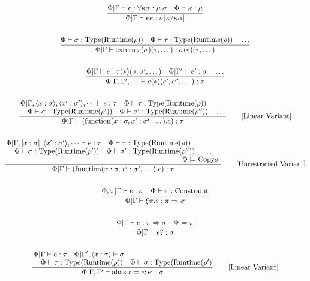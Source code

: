 \documentclass {article}
\begin{document}
\begin{gather*}
\\
\frac
{\Phi | \Gamma \vdash e : \forall \kappa \alpha : \mu. \sigma \quad \Phi \vdash \kappa : \mu}
{\Phi | \Gamma \vdash e \kappa : \sigma [\kappa/\kappa \alpha]} \\
\\
\frac
{\Phi \vdash \sigma : \text{Type}(\text{Runtime} (\rho)) \quad \Phi \vdash \tau : \text{Type}(\text{Runtime} (\rho)) \quad \dots}
{\Phi | \Gamma \vdash \text{extern} \, x ( \sigma )(\tau, \dots) : \sigma (*)(\tau, \dots)} \\
\\
\frac
{\Phi | \Gamma \vdash e : \tau(*)(\sigma, \sigma', \dots) \quad \Phi | \Gamma' \vdash e' : \sigma \quad \dots}
{\Phi | \Gamma, \Gamma', \dots \vdash e(*)(e',e'',\dots) : \tau} \\
\\
\frac
{\splitfrac
{\Phi | \Gamma, \langle x : \sigma \rangle , \langle x' : \sigma' \rangle, \dots \vdash e : \tau \quad \Phi \vdash \tau : \text{Type}(\text{Runtime}(\rho))}
{\Phi \vdash \sigma : \text{Type}(\text{Runtime}(\rho')) \quad \Phi \vdash \sigma' : \text{Type}(\text{Runtime}(\rho'')) \quad\dots }}
{\Phi | \Gamma \vdash (\text{function}(x : \sigma, x' : \sigma', \dots). e) : \tau } \tag*{[Linear Variant]}\\
\\
\frac
{\splitfrac
{\Phi | \Gamma, [x : \sigma], \langle x' : \sigma' \rangle, \dots \vdash e : \tau \quad \Phi \vdash \tau : \text{Type}(\text{Runtime}(\rho))}
{\splitfrac{
\Phi \vdash \sigma : \text{Type}(\text{Runtime}(\rho')) \quad \Phi \vdash \sigma' : \text{Type}(\text{Runtime}(\rho'')) \quad\dots }{
\Phi \models \text{Copy} \sigma 
}}}
{\Phi | \Gamma \vdash (\text{function}(x : \sigma, x' : \sigma', \dots). e) : \tau } \tag*{[Unrestricted Variant]}\\
\\
\frac
{\Phi, \pi | \Gamma \vdash e : \sigma \quad \Phi \vdash \pi : \text{Constraint}}
{\Phi | \Gamma \vdash \xi \pi. e : \pi \Rightarrow \sigma} \\
\\
\frac
{\Phi | \Gamma \vdash e : \pi \Rightarrow \sigma \quad \Phi \models \pi }
{\Phi | \Gamma \vdash e? : \sigma} \\
\\
\frac
{\splitfrac{ \Phi | \Gamma \vdash e : \tau \quad \Phi | \Gamma', \langle x : \tau \rangle \vdash \sigma}
{\Phi \vdash \tau : \text{Type}(\text{Runtime}(\rho)) \quad \Phi \vdash \sigma : \text{Type}(\text{Runtime}(\rho') }}
{\Phi | \Gamma, \Gamma' \vdash \text{alias} \, x = e; e' : \sigma} \tag*{[Linear Variant]} \\

\end{gather*}
\end{document}
